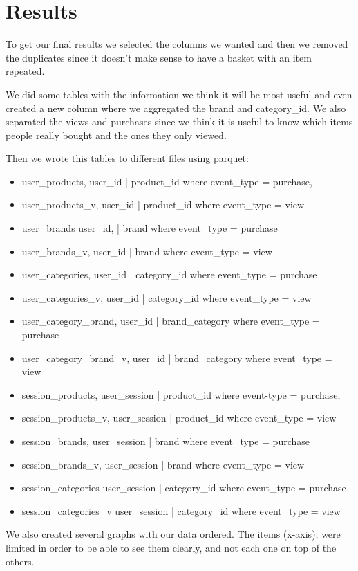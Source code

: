 \section{Results}
\label{results}

To get our final results we selected the columns we wanted and then we removed the duplicates since it doesn't make
sense to have a basket with an item repeated. 

We did some tables with the information we think it will be most useful and even created a new column where we aggregated
the brand and category_id. We also separated the views and purchases since we think it is useful to know which items
people really bought and the ones they only viewed.

Then we wrote this tables to different files using parquet:
\begin{itemize}
    \item user_products, user_id | product_id where event_type = purchase, 
    \item user_products_v, user_id | product_id where event_type = view 
    \item user_brands user_id, | brand where event_type = purchase
    \item user_brands_v, user_id | brand where event_type = view
    \item user_categories, user_id | category_id where event_type = purchase
    \item user_categories_v, user_id | category_id where event_type = view
    \item user_category_brand, user_id | brand_category where event_type = purchase
    \item user_category_brand_v, user_id | brand_category where event_type = view
    \item session_products, user_session | product_id where event-type = purchase, 
    \item session_products_v, user_session | product_id where event_type = view 
    \item session_brands, user_session | brand where event_type = purchase
    \item session_brands_v, user_session | brand where event_type = view
    \item session_categories user_session | category_id where event_type = purchase
    \item session_categories_v user_session | category_id where event_type = view
\end{itemize}

We also created several graphs with our data ordered. The items (x-axis), were limited in order to be able to see them clearly,
and not each one on top of the others.

